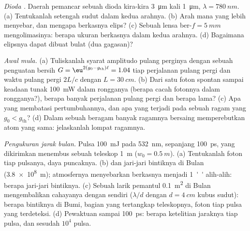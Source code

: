 \begin{exercise}[$\star\star\star$]\label{exo:b2:laser:10}
\emph{Dioda .} Daerah pemancar sebuah  dioda kira-kira
\qty{3}{\micro m} kali \qty{1}{\micro m}, $\lambda = \qty{780}{nm}$. (a)
Tentukanlah setengah sudut  dalam kedua arahnya. (b) Arah mana yang
lebih menyebar, dan mengapa berkasnya elips? (c) Sebuah lensa ber-$f =
\qty{5}{mm}$ mengolimasinya: berapa ukuran berkasnya dalam kedua arahnya. (d) Bagaimana
elipsnya dapat dibuat bulat (dua gagasan)?
\end{exercise}

\begin{exercise}[$\star\star\star$]\label{exo:b2:laser:11}
\emph{Awal mula.} (a) Tuliskanlah syarat amplitudo pulang perginya dengan sebuah
penguatan bersih $G = \eu^{2(g_0 - g_{\text{th}})\ell} = 1.04$ tiap perjalanan pulang pergi
dan waktu pulang pergi $2L/c$ dengan $L = \qty{30}{cm}$. (b) Dari satu
foton spontan sampai keadaan tunak \qty{100}{mW} dalam rongganya
(berapa cacah fotonnya dalam rongganya?), berapa banyak perjalanan pulang pergi dan berapa lama?
(c) Apa yang membatasi pertumbuhannya, dan apa yang terjadi pada sebuah ragam yang
$g_0 < g_{\text{th}}$? (d) Dalam sebuah  beragam banyak ragamnya bersaing memperebutkan
atom yang sama: jelaskanlah lompat ragamnya.
\end{exercise}

\begin{exercise}[$\star\star\star$]\label{exo:b2:laser:12}
\emph{Pengukuran jarak bulan.} Pulsa \qty{100}{mJ} pada \qty{532}{nm},
sepanjang \qty{100}{ps}, yang dikirimkan menembus sebuah teleskop \qty{1}{m} ($w_0 =
\qty{0.5}{m}$). (a) Tentukanlah foton tiap pulsanya, daya puncaknya. (b) 
 dan jari-jari bintiknya di Bulan (\qty{3.8e8}{m}); atmosfernya
menyebarkan berkasnya menjadi \qty{1}{''} alih-alih: berapa jari-jari bintiknya. (c) Sebuah larik
pemantul \qty{0.1}{m^2} di Bulan mengembalikan cahayanya dengan
 sendiri ($\lambda/d$ dengan $d = \qty{4}{cm}$ kubus sudut): berapa bintiknya di
Bumi, bagian yang tertangkap teleskopnya, foton tiap pulsa yang terdeteksi.
(d) Pewaktuan sampai \qty{100}{ps}: berapa ketelitian jaraknya tiap pulsa, dan sesudah
$10^4$ pulsa.
\end{exercise}

